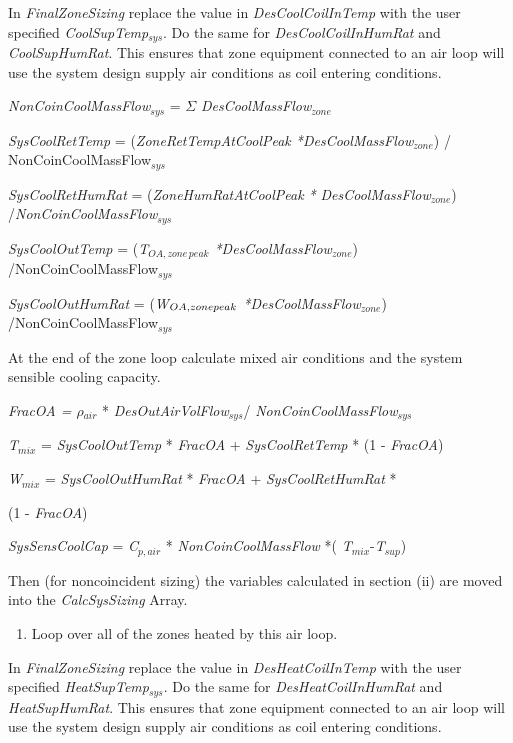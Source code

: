 In \emph{FinalZoneSizing} replace the value in \emph{DesCoolCoilInTemp} with the user specified \emph{CoolSupTemp\(_{sys}\)}. Do the same for \emph{DesCoolCoilInHumRat} and \emph{CoolSupHumRat}. This ensures that zone equipment connected to an air loop will use the system design supply air conditions as coil entering conditions.

 \emph{NonCoinCoolMassFlow\(_{sys}\)} = $\Sigma$ \emph{DesCoolMassFlow\(_{zone}\)}
  
 \emph{SysCoolRetTemp} = (\emph{ZoneRetTempAtCoolPeak *DesCoolMassFlow\(_{zone}\)}) / {NonCoinCoolMassFlow\(_{sys}\)}
 
 \emph{SysCoolRetHumRat} = (\emph{ZoneHumRatAtCoolPeak *} \emph{DesCoolMassFlow\(_{zone}\)}) /\emph{NonCoinCoolMassFlow\(_{sys}\)}
 
 \emph{SysCoolOutTemp} = (\emph{T\(_{OA,zone\, peak}\) *DesCoolMassFlow\(_{zone}\)}) /NonCoinCoolMassFlow\(_{sys}\)
 
 \emph{SysCoolOutHumRat} = (\emph{W\(_{OA,zone\\ peak}\) *DesCoolMassFlow\(_{zone}\)}) /NonCoinCoolMassFlow\(_{sys}\)

At the end of the zone loop calculate mixed air conditions and the system sensible cooling capacity.

\emph{FracOA = $\rho$\(_{air}\)} * \emph{DesOutAirVolFlow\(_{sys}\)}/ \emph{NonCoinCoolMassFlow\(_{sys}\)}

\emph{T\(_{mix}\)} = \emph{SysCoolOutTemp} * \emph{FracOA} + \emph{SysCoolRetTemp} * (1 - \emph{FracOA})

\emph{W\(_{mix}\)} = \emph{SysCoolOutHumRat} * \emph{FracOA} + \emph{SysCoolRetHumRat} *

(1 - \emph{FracOA})

\emph{SysSensCoolCap} = \emph{C\(_{p,air}\)} * \emph{NonCoinCoolMassFlow} *( \emph{T\(_{mix}\)}-\emph{T\(_{sup}\)})

Then (for noncoincident sizing) the variables calculated in section (ii) are moved into the \emph{CalcSysSizing} Array.

\begin{enumerate}
\def\labelenumi{(\alph{enumi})}
\setcounter{enumi}{2}
\item Loop over all of the zones heated by this air loop.
\end{enumerate}

In \emph{FinalZoneSizing} replace the value in \emph{DesHeatCoilInTemp} with the user specified \emph{HeatSupTemp\(_{sys}\)}. Do the same for \emph{DesHeatCoilInHumRat} and \emph{HeatSupHumRat}. This ensures that zone equipment connected to an air loop will use the system design supply air conditions as coil entering conditions.

